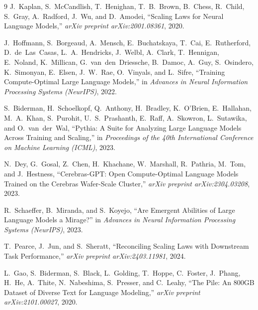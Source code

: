 \documentclass[11pt]{article}
\begin{document}
\begin{thebibliography}{9}
J.~Kaplan, S.~McCandlish, T.~Henighan, T.~B.~Brown, B.~Chess, R.~Child, S.~Gray, A.~Radford, J.~Wu, and D.~Amodei,
``Scaling Laws for Neural Language Models,''
\emph{arXiv preprint arXiv:2001.08361}, 2020.

J.~Hoffmann, S.~Borgeaud, A.~Mensch, E.~Buchatskaya, T.~Cai, E.~Rutherford, D.~de~Las~Casas, L.~A.~Hendricks, J.~Welbl, A.~Clark, T.~Hennigan, E.~Noland, K.~Millican, G.~van~den~Driessche, B.~Damoc, A.~Guy, S.~Osindero, K.~Simonyan, E.~Elsen, J.~W.~Rae, O.~Vinyals, and L.~Sifre,
``Training Compute-Optimal Large Language Models,''
in \emph{Advances in Neural Information Processing Systems (NeurIPS)}, 2022.

S.~Biderman, H.~Schoelkopf, Q.~Anthony, H.~Bradley, K.~O'Brien, E.~Hallahan, M.~A.~Khan, S.~Purohit, U.~S.~Prashanth, E.~Raff, A.~Skowron, L.~Sutawika, and O.~van~der~Wal,
``Pythia: A Suite for Analyzing Large Language Models Across Training and Scaling,''
in \emph{Proceedings of the 40th International Conference on Machine Learning (ICML)}, 2023.

N.~Dey, G.~Gosal, Z.~Chen, H.~Khachane, W.~Marshall, R.~Pathria, M.~Tom, and J.~Hestness,
``Cerebras-GPT: Open Compute-Optimal Language Models Trained on the Cerebras Wafer-Scale Cluster,''
\emph{arXiv preprint arXiv:2304.03208}, 2023.

R.~Schaeffer, B.~Miranda, and S.~Koyejo,
``Are Emergent Abilities of Large Language Models a Mirage?''
in \emph{Advances in Neural Information Processing Systems (NeurIPS)}, 2023.

T.~Pearce, J.~Jun, and S.~Sheratt,
``Reconciling Scaling Laws with Downstream Task Performance,''
\emph{arXiv preprint arXiv:2403.11981}, 2024.

L.~Gao, S.~Biderman, S.~Black, L.~Golding, T.~Hoppe, C.~Foster, J.~Phang, H.~He, A.~Thite, N.~Nabeshima, S.~Presser, and C.~Leahy,
``The Pile: An 800GB Dataset of Diverse Text for Language Modeling,''
\emph{arXiv preprint arXiv:2101.00027}, 2020.
\end{thebibliography}
\end{document}
